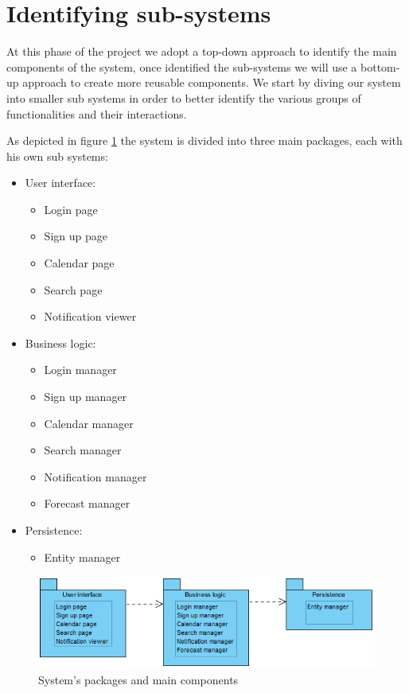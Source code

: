 \documentclass[10pt,a4paper,titlepage]{article}
\begin{document}
\section{Identifying sub-systems}
At this phase of the project we adopt a top-down approach to identify the main components of the system, once identified the sub-systems we will use a bottom-up approach to create more reusable components. We start by diving our system into smaller sub systems in order to better identify the various groups of functionalities and their interactions.

As depicted in figure \ref{fig:subsystems} the system is divided into three main packages, each with his own sub systems:
\begin{itemize}
\item User interface:
\begin{itemize}
\item Login page
\item Sign up page
\item Calendar page
\item Search page
\item Notification viewer
\end{itemize}

\item Business logic:
\begin{itemize}
\item Login manager
\item Sign up manager
\item Calendar manager
\item Search manager
\item Notification manager
\item Forecast manager
\end{itemize}

\item Persistence:
\begin{itemize}
\item Entity manager
\end{itemize}
\end{itemize}

\begin{figure}[h]
\centering
\includegraphics[width=\linewidth]{./images/sub-systems}
\caption[Subsystems]{System's packages and main components}
\label{fig:subsystems}
\end{figure}
\end{document}
